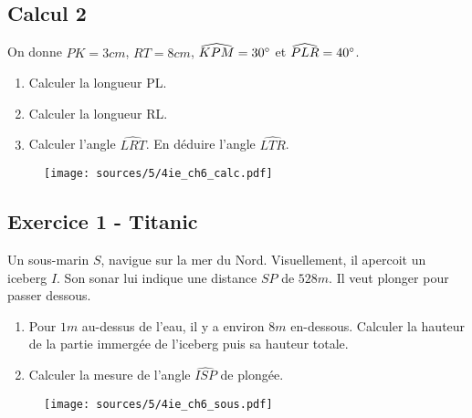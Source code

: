 \documentclass[10pt]{article}
\begin{document}
\begin{multicols}{2}
  \subsection*{Calcul 2}
  On donne $PK = 3cm$, $RT = 8cm$, $\widehat{KPM} = 30\degree$ et $\widehat{PLR} = 40\degree$.

  \begin{enumerate}
  \item[1.] Calculer la longueur PL.
  \item[2.] Calculer la longueur RL.
  \item[3.] Calculer l'angle $\widehat{LRT}$. En déduire l'angle $\widehat{LTR}$.
  \end{enumerate}

  \begin{figure}[H]
    \centering
    \texttt{[image: sources/5/4ie\_ch6\_calc.pdf]}
  \end{figure}

\end{multicols}

\begin{multicols}{2}
  \subsection*{Exercice 1 - Titanic} 

  Un sous-marin $S$, navigue sur la mer du Nord. Visuellement, il apercoit un iceberg $I$. Son sonar lui indique une distance $SP$ de $528m$. Il veut plonger pour passer dessous.

  \begin{enumerate}
  \item[1.] Pour $1m$ au-dessus de l'eau, il y a environ $8m$ en-dessous. Calculer la hauteur de la partie immergée de l'iceberg puis sa hauteur totale.
  \item[2.] Calculer la mesure de l'angle $\widehat{ISP}$ de plongée.
  \end{enumerate}

  \begin{figure}[H]
    \centering
    \texttt{[image: sources/5/4ie\_ch6\_sous.pdf]}
  \end{figure}
\end{multicols}
\end{document}
